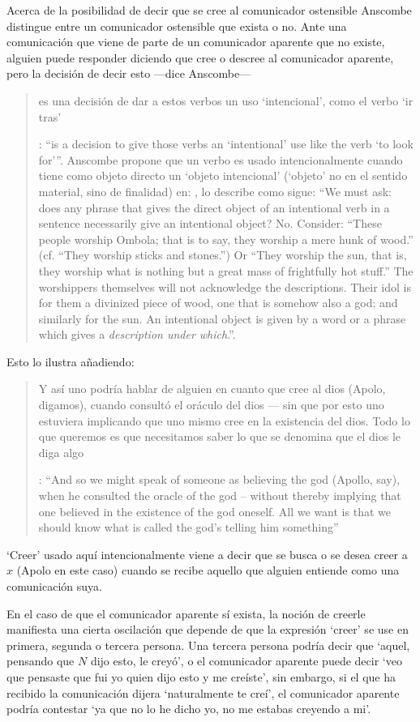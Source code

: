 Acerca de la posibilidad de decir que se cree al comunicador ostensible Anscombe distingue entre un comunicador ostensible que exista o no. Ante una comunicación que viene de parte de un comunicador aparente que no existe, alguien puede responder diciendo que cree o descree al comunicador aparente, pero la decisión de decir esto ---dice Anscombe--- \blockquote[{\cite[7]{anscombe2008faith:tobelieve}}: \enquote{is a decision to give those verbs an `intentional' use like the verb `to look for'}. Anscombe propone que un verbo es usado intencionalmente cuando tiene como objeto directo un `objeto intencional' (`objeto' no en el sentido material, sino de finalidad) en: {\cite[9]{anscombe1981metaphysics:intsens}, lo describe como sigue: \enquote{We must ask: does any phrase that gives the direct object of an intentional verb in a sentence necessarily give an intentional object? No. Consider: ``These people worship Ombola; that is to say, they worship a mere hunk of wood.'' (cf. ``They worship sticks and stones.'') Or ``They worship the sun, that is, they worship what is nothing but a great mass of frightfully hot stuff.'' The worshippers themselves will not acknowledge the descriptions. Their idol is for them a divinized piece of wood, one that is somehow also a god; and similarly for the sun. An intentional object is given by a word or a phrase which gives a \emph{description under which}.}}.]{es una decisión de dar a estos verbos un uso `intencional', como el verbo `ir tras'}. Esto lo ilustra añadiendo: \blockquote[{\cite[7]{anscombe2008faith:tobelieve}}: \enquote{And so we might speak of someone as believing the god (Apollo, say), when he consulted the oracle of the god -- without thereby implying that one believed in the existence of the god oneself. All we want is that we should know what is called the god's telling him something}]{Y así uno podría hablar de alguien en cuanto que cree al dios (Apolo, digamos), cuando consultó el oráculo del dios --- sin que por esto uno estuviera implicando que uno mismo cree en la existencia del dios. Todo lo que queremos es que necesitamos saber lo que se denomina que el dios le diga algo}. `Creer' usado aquí intencionalmente viene a decir que se busca o se desea creer a $x$ (Apolo en este caso) cuando se recibe aquello que alguien entiende como una comunicación suya.

En el caso de que el comunicador aparente sí exista, la noción de creerle manifiesta una cierta oscilación que depende de que la expresión `creer' se use en primera, segunda o tercera persona. Una tercera persona podría decir que \enquote*{aquel, pensando que $N$ dijo esto, le creyó}, o el comunicador aparente puede decir \enquote*{veo que pensaste que fui yo quien dijo esto y me creíste}, sin embargo, si el que ha recibido la comunicación dijera \enquote*{naturalmente te creí}, el comunicador aparente podría contestar \enquote*{ya que no lo he dicho yo, no me estabas creyendo a mi}.

